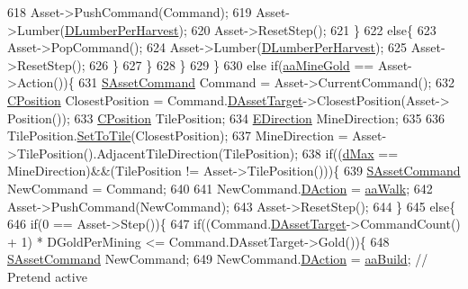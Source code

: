 \begin{DoxyCode}
618                         Asset->PushCommand(Command);
619                         Asset->Lumber(\hyperlink{classCGameModel_abfa4628f678b64ecfefb9f56150d906f}{DLumberPerHarvest});
620                         Asset->ResetStep();
621                     \}
622                     \textcolor{keywordflow}{else}\{
623                         Asset->PopCommand();
624                         Asset->Lumber(\hyperlink{classCGameModel_abfa4628f678b64ecfefb9f56150d906f}{DLumberPerHarvest});
625                         Asset->ResetStep();
626                     \}
627                 \}
628             \}
629         \}
630         \textcolor{keywordflow}{else} \textcolor{keywordflow}{if}(\hyperlink{GameDataTypes_8h_ab47668e651a3032cfb9c40ea2d60d670abc45b1c4fbca1481e373a780a69bd56b}{aaMineGold} == Asset->Action())\{
631             \hyperlink{structSAssetCommand}{SAssetCommand} Command = Asset->CurrentCommand();
632             \hyperlink{classCPosition}{CPosition} ClosestPosition = Command.\hyperlink{structSAssetCommand_a3d9b43f6e59c386c48c41a65448a0c39}{DAssetTarget}->ClosestPosition(Asset->
      Position());
633             \hyperlink{classCPosition}{CPosition} TilePosition;
634             \hyperlink{GameDataTypes_8h_acb2b033915f6659a71a38b5aa6e4eb42}{EDirection} MineDirection;
635             
636             TilePosition.\hyperlink{classCPosition_ae302aa21792de64c97de29e2cbbfeb94}{SetToTile}(ClosestPosition);
637             MineDirection = Asset->TilePosition().AdjacentTileDirection(TilePosition);
638             \textcolor{keywordflow}{if}((\hyperlink{GameDataTypes_8h_acb2b033915f6659a71a38b5aa6e4eb42af6546049275557ce0ade2ceee042a319}{dMax} == MineDirection)&&(TilePosition != Asset->TilePosition()))\{
639                 \hyperlink{structSAssetCommand}{SAssetCommand} NewCommand = Command;
640                 
641                 NewCommand.\hyperlink{structSAssetCommand_a8edd3b3d59a76d5514ba403bc8076a75}{DAction} = \hyperlink{GameDataTypes_8h_ab47668e651a3032cfb9c40ea2d60d670a60ca9010aa62b73c1aab838ff4bf7276}{aaWalk};
642                 Asset->PushCommand(NewCommand);
643                 Asset->ResetStep();
644             \}
645             \textcolor{keywordflow}{else}\{
646                 \textcolor{keywordflow}{if}(0 == Asset->Step())\{
647                     \textcolor{keywordflow}{if}((Command.\hyperlink{structSAssetCommand_a3d9b43f6e59c386c48c41a65448a0c39}{DAssetTarget}->CommandCount() + 1) * DGoldPerMining <= 
       Command.DAssetTarget->Gold())\{
648                         \hyperlink{structSAssetCommand}{SAssetCommand} NewCommand;
649                         NewCommand.\hyperlink{structSAssetCommand_a8edd3b3d59a76d5514ba403bc8076a75}{DAction} = \hyperlink{GameDataTypes_8h_ab47668e651a3032cfb9c40ea2d60d670a02b95b7163284c6e80c9008073d8480d}{aaBuild}; \textcolor{comment}{// Pretend active}

\end{DoxyCode}
